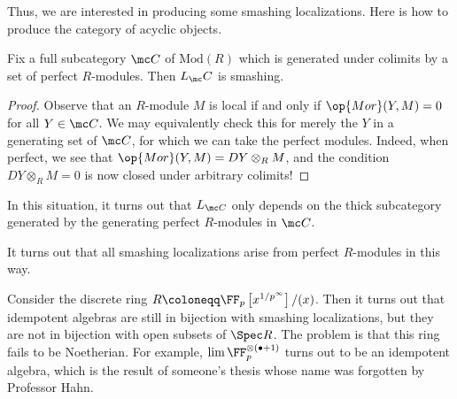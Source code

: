 \documentclass[../notes.tex]{subfiles}
\begin{document}
Thus, we are interested in producing some smashing localizations. Here is how to produce the category of acyclic objects.
\begin{proposition}
	Fix a full subcategory $\mc C$ of $\mathrm{Mod}(R)$ which is generated under colimits by a set of perfect $R$-modules. Then $L_\mc C$ is smashing.
\end{proposition}
\begin{proof}
	Observe that an $R$-module $M$ is local if and only if $\op{Mor}(Y,M)=0$ for all $Y\in\mc C$. We may equivalently check this for merely the $Y$ in a generating set of $\mc C$, for which we can take the perfect modules. Indeed, when perfect, we see that $\op{Mor}(Y,M)=DY\otimes_RM$, and the condition $DY\otimes_RM=0$ is now closed under arbitrary colimits!
\end{proof}
\begin{remark}
	In this situation, it turns out that $L_{\mc C}$ only depends on the thick subcategory generated by the generating perfect $R$-modules in $\mc C$.
\end{remark}
\begin{remark}
	It turns out that all smashing localizations arise from perfect $R$-modules in this way.
\end{remark}
\begin{example}
	Consider the discrete ring $R\coloneqq\FF_p\left[x^{1/p^\infty}\right]/(x)$. Then it turns out that idempotent algebras are still in bijection with smashing localizations, but they are not in bijection with open subsets of $\Spec R$. The problem is that this ring fails to be Noetherian. For example, $\lim\FF_p^{\otimes(\bullet+1)}$ turns out to be an idempotent algebra, which is the result of someone's thesis whose name was forgotten by Professor Hahn.
\end{example}
\end{document}
